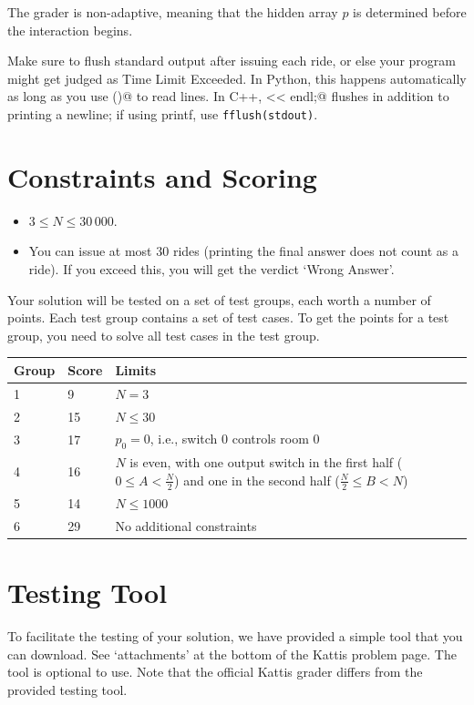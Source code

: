 The grader is non-adaptive, meaning that the hidden array $p$ is determined before the interaction begins.

Make sure to flush standard output after issuing each ride, or else your program might get judged as Time Limit Exceeded.
In Python, this happens automatically as long as you use \verb@input()@ to read lines. In C++, \verb@cout << endl;@ flushes in addition to printing a newline; if using printf, use \texttt{fflush(stdout)}.


\section*{Constraints and Scoring}
\begin{itemize}
  \item  $3 \le N \le 30\,000$.
  \item You can issue at most $30$ rides (printing the final answer does not count as a ride). If you exceed this, you will get the verdict `Wrong Answer'.
\end{itemize}

\noindent
Your solution will be tested on a set of test groups, each worth a number of points.
Each test group contains a set of test cases. To get the points for a test group, you need to solve all test cases in the test group.

\noindent
\begin{tabular}{| l | l | l |}
\hline
Group & Score & Limits \\ \hline
  1 & 9 & $N = 3$ \\ \hline
  2 & 15 & $N \le 30$ \\ \hline
  3 & 17 & $p_{0} = 0$, i.e., switch $0$ controls room $0$ \\ \hline
  4 & 16 & $N$ is even, with one output switch in the first half ($0 \le A < \frac{N}{2}$) and one in the second half ($\frac{N}{2} \le B < N$)  \\ \hline
  5 & 14 & $N \le 1000$ \\ \hline
  6 & 29 & No additional constraints  \\ \hline
\end{tabular}


\section*{Testing Tool}
To facilitate the testing of your solution, we have provided a simple tool that you can download.
See `attachments' at the bottom of the Kattis problem page. The tool is optional to use. Note that the official Kattis grader differs from the provided testing tool.


